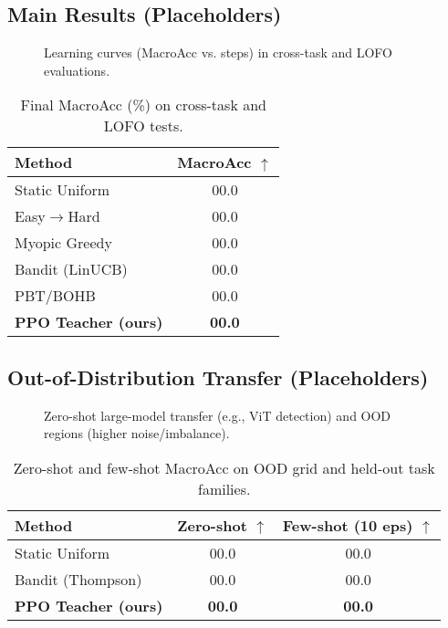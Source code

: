 \documentclass[11pt]{article}
\newcommand{\1}{\mathbf{1}}
\begin{document}
\subsection{Main Results (Placeholders)}
\begin{figure}[H]
  \centering
  \fbox{\rule{0pt}{2in}\rule{0.95\linewidth}{0pt}}
  \caption{Learning curves (MacroAcc vs. steps) in cross-task and LOFO evaluations.}
  \label{fig:indist}
\end{figure}

\begin{table}[H]
\centering
\caption{Final MacroAcc (\%) on cross-task and LOFO tests.}
\label{tab:indist}
\begin{tabular}{lc}
\toprule
Method & MacroAcc $\uparrow$ \\
\midrule
Static Uniform & 00.0 \\
Easy$\to$Hard & 00.0 \\
Myopic Greedy & 00.0 \\
Bandit (LinUCB) & 00.0 \\
PBT/BOHB & 00.0 \\
\textbf{PPO Teacher (ours)} & \textbf{00.0} \\
\bottomrule
\end{tabular}
\end{table}

\subsection{Out-of-Distribution Transfer (Placeholders)}
\begin{figure}[H]
  \centering
  \fbox{\rule{0pt}{2in}\rule{0.95\linewidth}{0pt}}
  \caption{Zero-shot large-model transfer (e.g., ViT detection) and OOD regions (higher noise/imbalance).}
  \label{fig:ood}
\end{figure}

\begin{table}[H]
\centering
\caption{Zero-shot and few-shot MacroAcc on OOD grid and held-out task families.}
\label{tab:ood}
\begin{tabular}{lcc}
\toprule
Method & Zero-shot $\uparrow$ & Few-shot (10 eps) $\uparrow$ \\
\midrule
Static Uniform & 00.0 & 00.0 \\
Bandit (Thompson) & 00.0 & 00.0 \\
\textbf{PPO Teacher (ours)} & \textbf{00.0} & \textbf{00.0} \\
\bottomrule
\end{tabular}
\end{table}
\end{document}
